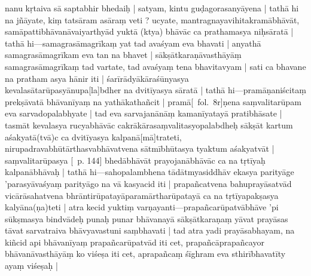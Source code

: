 \documentclass[12pt]{article}
\newcommand{\emdash} {\hspace{0em}—\hspace{0em}}
\begin{document}
nanu kṛtaiva sā saptabhir bhedaiḥ | satyam, kintu guḍagorasanyāyena | tathā hi na jñāyate, kiṃ tatsāram asāraṃ veti ? ucyate, mantragnayavihitakramābhāvāt, samāpattibhāvanāvaiyarthyād yuktā (ktya) bhāvāc ca prathamasya niḥsāratā | tathā hi\emdash samagrasāmagrīkaṃ yat tad avaśyam eva bhavati | anyathā samagrasāmagrīkam eva tan na bhavet | sākṣātkaraṇāvasthāyāṃ samagrasāmagrīkaṃ tad vartate, tad avaśyaṃ tena bhavitavyam | sati ca bhavane na pratham asya hānir iti | śarīrādyākāraśūnyasya kevalasātarūpasyānupa[la]bdher na dvitīyasya sāratā | tathā hi\emdash pramāṇaniścitaṃ prekṣāvatā bhāvanīyaṃ na yathākathañcit | pramā[\MS\ fol.\ 8r]ṇena saṃvalitarūpam eva sarvadopalabhyate | tad eva sarvajanānāṃ kamanīyatayā pratibhāsate | tasmāt kevalasya rucyabhāvāc cakrākārasaṃvalitasyopalabdheḥ sākṣāt kartum aśakyatā(tvā)c ca dvitīyasya kalpanā[mā]trateti, nirupadravabhūtārthasvabhāvatvena sātmībhūtasya tyaktum aśakyatvāt | saṃvalitarūpasya [\EDD\ p. 144] bhedābhāvāt prayojanābhāvāc ca na tṛtīyaḥ kalpanābhāvaḥ | tathā hi\emdash sahopalambhena tādātmyasiddhāv ekasya parityāge 'parasyāvaśyaṃ parityāgo na vā kasyacid iti | prapañcatvena bahuprayāsatvād vicārāsahatvena bhrāntirūpatayāparamārtharūpatayā ca na tṛtīyapakṣasya kalyāna(ṇa)teti |  atra kecid yuktiṃ varṇayanti\emdash prapañcarūpatvābhāve 'pi sūkṣmasya bindvādeḥ punaḥ punar bhāvanayā sākṣātkaraṇaṃ yāvat prayāsas tāvat sarvatraiva bhāvyavastuni saṃbhavati | tad atra yadi prayāsabhayam, na kiñcid api bhāvanīyaṃ prapañcarūpatvād iti cet, prapañcāprapañcayor bhāvanāvasthāyāṃ ko viśeṣa iti cet, aprapañcaṃ śīghram eva sthirībhavatīty ayaṃ viśeṣaḥ |\\
\end{document}
